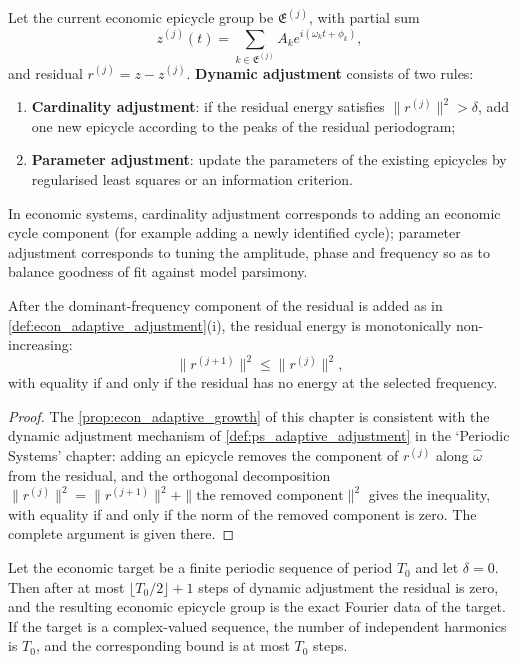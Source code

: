 \begin{definition}\label{def:econ_adaptive_adjustment}
Let the current economic epicycle group be $\mathfrak E^{(j)}$, with partial sum
\[
z^{(j)}(t)=\sum_{k\in\mathfrak E^{(j)}}A_k e^{i(\omega_k t+\phi_k)},
\]
and residual $r^{(j)}=z-z^{(j)}$. \textbf{Dynamic adjustment} consists of two rules:
\begin{enumerate}[label=(\roman*)]
    \item \textbf{Cardinality adjustment}: if the residual energy satisfies $\|r^{(j)}\|^2>\delta$, add one new epicycle according to the peaks of the residual periodogram;
    \item \textbf{Parameter adjustment}: update the parameters of the existing epicycles by regularised least squares or an information criterion.
\end{enumerate}
In economic systems, cardinality adjustment corresponds to adding an economic cycle component (for example adding a newly identified cycle); parameter adjustment corresponds to tuning the amplitude, phase and frequency so as to balance goodness of fit against model parsimony.
\end{definition}

\begin{proposition}\label{prop:econ_adaptive_growth}
After the dominant-frequency component of the residual is added as in \cref{def:econ_adaptive_adjustment}(i), the residual energy is monotonically non-increasing:
\[
\|r^{(j+1)}\|^2\le\|r^{(j)}\|^2,
\]
with equality if and only if the residual has no energy at the selected frequency.
\end{proposition}

\begin{proof}
The \cref{prop:econ_adaptive_growth} of this chapter is consistent with the dynamic adjustment mechanism of \cref{def:ps_adaptive_adjustment} in the `Periodic Systems' chapter:
adding an epicycle removes the component of $r^{(j)}$ along $\hat\omega$ from the residual, and the orthogonal decomposition
$\|r^{(j)}\|^2=\|r^{(j+1)}\|^2+\|\text{the removed component}\|^2$ gives the inequality,
with equality if and only if the norm of the removed component is zero. The complete argument is given there.
\end{proof}

\begin{theorem}\label{thm:econ_adaptive_convergence}
Let the economic target be a finite periodic sequence of period $T_0$ and let $\delta=0$. Then after at most $\lfloor T_0/2\rfloor+1$ steps of dynamic adjustment the residual is zero, and the resulting economic epicycle group is the exact Fourier data of the target. If the target is a complex-valued sequence, the number of independent harmonics is $T_0$, and the corresponding bound is at most $T_0$ steps.
\end{theorem}

